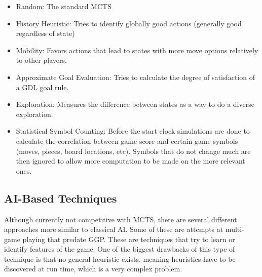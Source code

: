 \begin{itemize}

\item Random: The standard MCTS

\item History Heuristic: Tries to identify globally good actions (generally good regardless of state)

\item Mobility: Favors actions that lead to states with more move options relatively to other players.

\item Approximate Goal Evaluation: Tries to calculate the degree of satisfaction of a GDL goal rule. 

\item Exploration: Measures the difference between states as a way to do a diverse exploration. 

\item Statistical Symbol Counting: Before the start clock simulations are done to calculate the correlation between game score and certain game symbols (moves, pieces, board locations, etc). Symbols that do not change much are then ignored to allow more computation to be made on the more relevant ones.

\end{itemize}

\subsection{AI-Based Techniques}
Although currently not competitive with MCTS, there are several different approaches more similar to classical AI. Some of these are attempts at multi-game playing that predate GGP. These are techniques that try to learn or identify features of the game. One of the biggest drawbacks of this type of technique is that no general heuristic exists, meaning heuristics have to be discovered at run time, which is a very complex problem.

